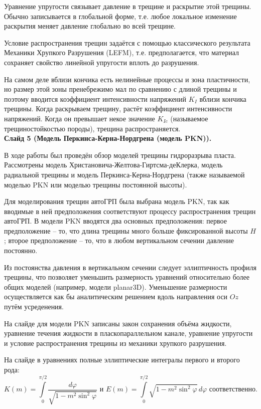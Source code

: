 \documentclass[a4paper, 12pt]{article}
\begin{document}
Уравнение упругости связывает давление в трещине и раскрытие этой трещины.
Обычно записывается в глобальной форме, т.е. любое локальное изменение раскрытия меняет давление глобально во всей трещине.

Условие распространения трещин задаётся с помощью классического результата Механики Хрупкого Разрушения (LEFM), т.е. предполагается, что материал сохраняет свойство линейной упругости вплоть до разрушения.

На самом деле вблизи кончика есть нелинейные процессы и зона пластичности, но размер этой зоны пренебрежимо мал по сравнению с длиной трещины и поэтому вводится коэффициент интенсивности напряжений $K_I$ вблизи кончика трещины.
Когда раскрываем трещину, растёт коэффициент интенсивности напряжений.
Когда он превышает некое значение $K_{Ic}$ (называемое трещиностойкостью породы), трещина распространяется.
\\


\textbf{Слайд 5 (Модель Перкинса-Керна-Нордгрена (модель PKN)).}

В ходе работы был проведён обзор моделей трещины гидроразрыва пласта.
Рассмотрены модель Христановича-Желтова-Гиртсма-деКлерка, модель радиальной трещины и модель Перкинса-Керна-Нордгрена (также называемой моделью PKN или моделью трещины постоянной высоты).

Для моделирования трещин автоГРП была выбрана модель PKN, так как вводимые в ней предположения соответствуют процессу распространения трещин автоГРП.
В модели PKN вводятся два основных предположения: первое предположение -- то, что длина трещины много больше фиксированной высоты $H$; второе предположение -- то, что в любом вертикальном сечении давление постоянно.

Из постоянства давления в вертикальном сечении следует эллиптичность профиля трещины, что позволяет уменьшить размерность уравнений относительно более общих моделей (например, модели planar3D).
Уменьшение размерности осуществляется как бы аналитическим решением вдоль направления оси $Oz$ путём усреденения.

На слайде для модели PKN записаны закон сохранения объёма жидкости, уравнение течения жидкости в пласкопараллельном канале, уравнение упругости и условие распространения трещины из механики хрупкого разрушения.

На слайде в уравнениях полные эллиптические интегралы первого и второго рода:
$$K(m)=\int\limits_{0}^{\pi/2}{\frac{d\varphi}{\sqrt{1-m^2\sin^2{\!\varphi}}}}\text{ и } E(m)=\int\limits_{0}^{\pi/2}{\sqrt{1-m^2\sin^2{\!\varphi}}\,d\varphi}\text{ соответственно.}$$
\\
\end{document}
